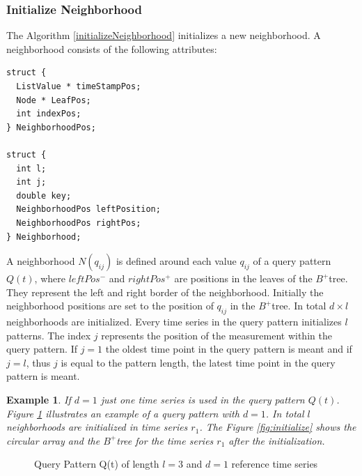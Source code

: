 \documentclass[abstracton,12pt]{scrreprt}
\newtheorem{example}{Example}
\begin{document}
\subsubsection{Initialize Neighborhood}
The Algorithm \ref{initializeNeighborhood} initializes a new neighborhood. A neighborhood consists of the following attributes: 
\lstset{language=C}
\begin{lstlisting}
struct {
  ListValue * timeStampPos;
  Node * LeafPos;
  int indexPos;
} NeighborhoodPos;

struct {
  int l;
  int j;
  double key;
  NeighborhoodPos leftPosition;
  NeighborhoodPos rightPos;
} Neighborhood;
\end{lstlisting}
\BlankLine
A neighborhood $N(q_{ij})$ is defined around each value $q_{ij}$ of a query pattern $Q(t)$, where $leftPos^-$ and $rightPos^+$ are positions in the leaves of the $B^+$tree. They represent the left and right border of the neighborhood. Initially the neighborhood positions are set to the position of $q_{ij}$ in the $B^+$tree. In total $d \times l$ neighborhoods are initialized. Every time series in the query pattern initializes $l$ patterns. The index $j$ represents the position of the measurement within the query pattern. If $j=1$ the oldest time point in the query pattern is meant and if $j=l$, thus $j$ is equal to the pattern length, the latest time point in the query pattern is meant. 



\begin{example}
	If $d=1$ just one time series is used in the query pattern $Q(t)$. Figure \ref{Qpatt} illustrates an example of a query pattern with $d=1$. In total $l$ neighborhoods are initialized in time series $r_1$. The Figure \ref{fig:initialize} shows the circular array and the $B^+$tree for the time series $r_1$ after the initialization.
\end{example}

\begin{figure}[H]
	\centering
	\caption{Query Pattern Q(t) of length $l=3$ and $d=1$ reference time series}
	\label{Qpatt}
\end{figure}
\end{document}
